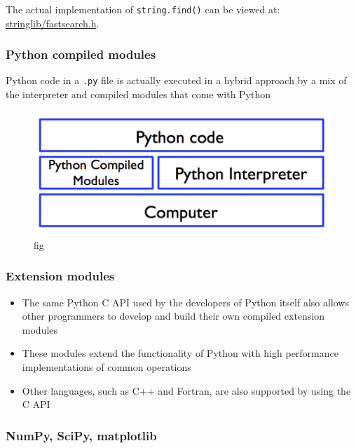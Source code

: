 \documentclass[12pt,letterpaper,twoside]{article}
\begin{document}
The actual implementation of \texttt{string.find()} can be viewed at:
\href{http://svn.python.org/view/python/trunk/Objects/stringlib/fastsearch.h}{stringlib/fastsearch.h}.

\subsubsection{Python compiled modules}

Python code in a \texttt{.py} file is actually executed in a hybrid
approach by a mix of the interpreter and compiled modules that come
with Python

\begin{figure}[h]
\centering
\includegraphics[scale=0.45]{fig/python-compiled-modules.png}
\caption{fig}
\end{figure}

\hypertarget{extension-modules}{%
\subsubsection{Extension modules}\label{extension-modules}}

\begin{itemize}
\item
  The same Python C API used by the developers of Python itself also
  allows other programmers to develop and build their own compiled
  extension modules
\item
  These modules extend the functionality of Python with high performance
  implementations of common operations
\item
  Other languages, such as C++ and Fortran, are also supported by using
  the C API
\end{itemize}

\hypertarget{numpy-scipy-matplotlib}{%
\subsubsection{NumPy, SciPy, matplotlib}\label{numpy-scipy-matplotlib}}
\end{document}
